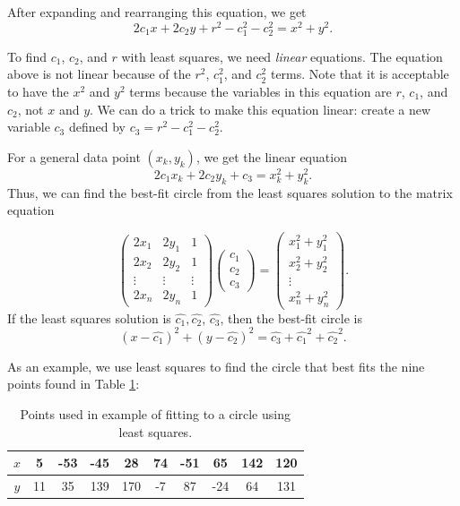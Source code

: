 After expanding and rearranging this equation, we get
\begin{equation*}
\label{circle2}
2c_1x + 2c_2y + r^2 - c_1^2 - c_2^2 = x^2 + y^2.
\end{equation*}

To find $c_1$, $c_2$, and $r$ with least squares, we need \emph{linear} equations.
The equation above is not linear because of the $r^2$, $c_1^2$, and $c_2^2$ terms. Note that it is acceptable to have the $x^2$ and $y^2$ terms because the variables in this equation are $r$, $c_1$, and $c_2$, not $x$ and $y$.
We can do a trick to make this equation linear: create a new variable $c_3$ defined by $c_3 = r^2-c_1^2-c_2^2$.

For a general data point $(x_k, y_k)$, we get the linear equation
\begin{equation*}
2c_1x_k+2c_2y_k+c_3=x_k^2+y_k^2.
\end{equation*}
Thus, we can find the best-fit circle from the least squares solution to the matrix equation

\begin{equation}\label{equ:circle_fit}
\begin{pmatrix}
2 x_1 & 2 y_1 & 1\\
2 x_2 & 2 y_2 & 1\\
\vdots & \vdots & \vdots \\
2 x_n & 2 y_n & 1
\end{pmatrix}
\begin{pmatrix}
c_1\\
c_2\\
c_3
\end{pmatrix}=
\begin{pmatrix}
x_1^2 + y_1^2\\
x_2^2 + y_2^2\\
\vdots\\
x_n^2 + y_n^2
\end{pmatrix}.
\end{equation}
If the least squares solution is $\widehat{c_1}, \widehat{c_2}$, $\widehat{c_3}$, then the best-fit circle is
\[
(x-\widehat{c_1})^2 + (y-\widehat{c_2})^2 = \widehat{c_3}+\widehat{c_1}^2+\widehat{c_2}^2.
\]

As an example, we use least squares to find the circle that best fits the nine points found in Table \ref{table:circlepts}:
\begin{table}
\begin{tabular}{c||c|c|c|c|c|c|c|c|c}
$x$& 5  &-53 & -45 &  28 & 74 & -51 &  65 & 142 & 120 \\ \hline
$y$& 11 & 35 & 139 & 170 & -7 &  87 & -24 &  64 & 131 \\
\end{tabular}
\caption{Points used in example of fitting to a circle using least squares.}
\label{table:circlepts}
\end{table}

